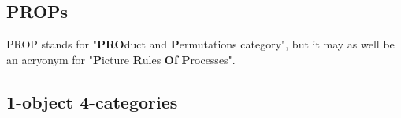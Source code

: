 \begin{defn}

\end{defn}

\begin{defn}

\end{defn}

\begin{example}

\end{example}

\begin{defn}

\end{defn}

\begin{defn}

\end{defn}

\begin{theorem}[Strictification]

\end{theorem}

\begin{theorem}[Graphical?]

\end{theorem}

\subsection{PROPs}

PROP stands for "\textbf{PRO}duct and \textbf{P}ermutations category", but it may as well be an acryonym for "\textbf{P}icture \textbf{R}ules \textbf{Of} \textbf{P}rocesses".

\subsection{1-object 4-categories}

